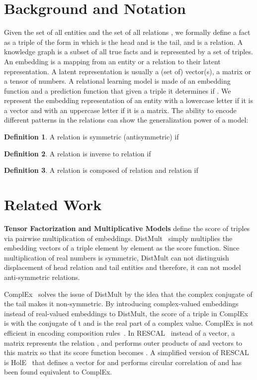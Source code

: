 \documentclass{ecai}
\begin{document}
\section{Background and Notation}
\label{sec:Background and Notation}
Given the set of all entities  and the set of all relations , we formally define a fact as a triple of the form  in which  is the head and  is the tail,  and  is a relation. A knowledge graph  is a subset of all true facts  and is represented by a set of triples.
An embedding is a mapping from an entity or a relation to their latent representation. A latent representation is usually a (set of) vector(s), a matrix or a tensor of numbers. A relational learning model is made of an embedding function and a prediction function that given a triple  it determines if . We represent the embedding representation of an entity  with a lowercase letter  if it is a vector and with an uppercase letter  if it is a matrix.  
The ability to encode different patterns in the relations can show the generalization power of a model:

\textbf{Definition 1}. A relation  is symmetric (antisymmetric) if 



\textbf{Definition 2}. A relation  is inverse to relation  if 



\textbf{Definition 3}. A relation  is composed of relation  and 
relation  if 



\section{Related Work}
\label{sec:Related Work}

\textbf{Tensor Factorization and Multiplicative Models} define the score of triples via pairwise multiplication of embeddings. DistMult~\cite{dismult} simply multiplies the embedding vectors of a triple element by element  as the score function. Since multiplication of real numbers is symmetric, DistMult can not distinguish displacement of head relation and tail entities and therefore, it can not model anti-symmetric relations.

ComplEx~\cite{trouillon2016complex} solves the issue of DistMult by the idea that the complex conjugate of the tail makes it non-symmetric. By introducing complex-valued embeddings instead of real-valued embeddings to DistMult, the score of a triple in ComplEx is  with  the conjugate of t and  is the real part of a complex value. ComplEx is not efficient in encoding composition rules~\cite{sun2019rotate}.
In RESCAL~\cite{nickel2011three} instead of a vector, a matrix represents the relation , and performs outer products of  and  vectors to this matrix so that its score function becomes . A simplified version of RESCAL is HolE~\cite{nickel2016holographic} that defines a vector for  and performs circular correlation of  and  has been found equivalent \cite{hayashi2017equivalence} to ComplEx. 
 
\end{document}
